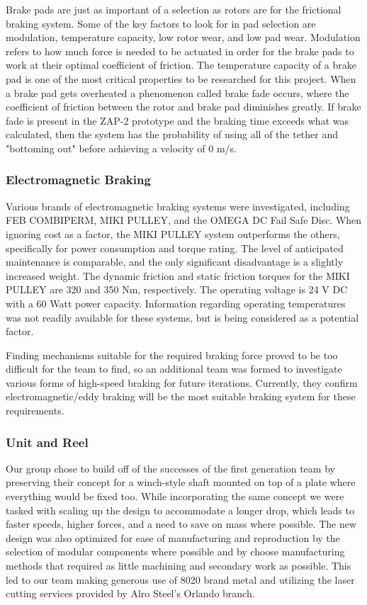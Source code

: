 \indent\indent Brake pads are just as important of a selection as rotors are for the frictional braking system. Some of the key factors to look for in pad selection are  modulation, temperature capacity, low rotor wear, and low pad wear. Modulation refers to how much force is needed to be actuated in order for the brake pads to work at their optimal coefficient of friction. The temperature capacity of a brake pad is one of the most critical properties to be researched for this project. When a brake pad gets overheated a phenomenon called brake fade occurs, where the coefficient of friction between the rotor and brake pad diminishes greatly. If brake fade is present in the ZAP-2 prototype and the braking time exceeds what was calculated, then the system has the probability of using all of the tether and "bottoming out" before achieving a velocity of 0 m/s.

\subsubsection{Electromagnetic Braking}

\indent\indent Various brands of electromagnetic braking systems were investigated, including FEB COMBIPERM, MIKI PULLEY, and the OMEGA DC Fail Safe Disc. When ignoring cost as a factor, the MIKI PULLEY system outperforms the others, specifically for power consumption and torque rating. The level of anticipated maintenance is comparable, and the only significant disadvantage is a slightly increased weight. The dynamic friction and static friction torques for the MIKI PULLEY are 320 and 350 Nm, respectively. The operating voltage is 24 V DC with a 60 Watt power capacity. Information regarding operating temperatures was not readily available for these systems, but is being considered as a potential factor.

Finding mechanisms suitable for the required braking force proved to be too difficult for the team to find, so an additional team was formed to investigate various forms of high-speed braking for future iterations. Currently, they confirm electromagnetic/eddy braking will be the most suitable braking system for these requirements.

\subsubsection{Unit and Reel}

\indent\indent Our group chose to build off of the successes of the first generation team by preserving their concept for a winch-style shaft mounted on top of a plate where everything would be fixed too. While incorporating the same concept we were tasked with scaling up the design to accommodate a longer drop, which leads to faster speeds, higher forces, and a need to save on mass where possible. The new design was also optimized for ease of manufacturing and reproduction by the selection of modular components where possible and by choose manufacturing methods that required as little machining and secondary work as possible. This led to our team making generous use of 8020 brand metal and utilizing the laser cutting services provided by Alro Steel's Orlando branch. 

